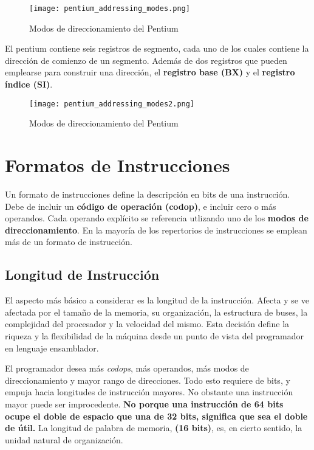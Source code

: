 \documentclass{article}
\begin{document}
\begin{figure}[h]
    \centering
    \texttt{[image: pentium\_addressing\_modes.png]}
    \caption{Modos de direccionamiento del Pentium
        \cite{stallings2006organización}}
    \label{fig:modos-direccionamiento-pentium}
\end{figure}

El pentium contiene seis registros de segmento, cada uno de los cuales contiene
la direcci\'{o}n de comienzo de un segmento. Adem\'{a}s de dos registros que
pueden emplearse para construir una direcci\'{o}n, el \textbf{registro base (BX)}
y el \textbf{registro \'{i}ndice (SI)}.

\begin{figure}[h]
    \centering
    \texttt{[image: pentium\_addressing\_modes2.png]}
    \caption{Modos de direccionamiento del Pentium
        \cite{stallings2006organización}}
    \label{fig:modos-direccionamiento-powerpc}
\end{figure}

\section*{Formatos de Instrucciones}
Un formato de instrucciones define la descripci\'{o}n en bits de una instrucci\'{o}n.
Debe de incluir un \textbf{c\'{o}digo de operaci\'{o}n (codop)}, e incluir
cero o m\'{a}s operandos. Cada operando expl\'{i}cito se referencia utlizando
uno de los \textbf{modos de direccionamiento}. En la mayor\'{i}a de los repertorios
de instrucciones se emplean m\'{a}s de un formato de instrucci\'{o}n.

\subsection*{Longitud de Instrucci\'{o}n}
El aspecto m\'{a}s b\'{a}sico a considerar es la longitud de la instrucci\'{o}n.
Afecta y se ve afectada por el tama\~{n}o de la memoria, su organizaci\'{o}n,
la estructura de buses, la complejidad del procesador y la velocidad del mismo.
Esta decisi\'{o}n define la riqueza y la flexibilidad de la m\'{a}quina desde un
punto de vista del programador en lenguaje ensamblador.

El programador desea m\'{a}s \textit{codops}, m\'{a}s operandos, m\'{a}s modos de
direccionamiento y mayor rango de direcciones. Todo esto requiere de bits, y
empuja hacia longitudes de instrucci\'{o}n mayores. No obstante una instrucci\'{o}n
mayor puede ser improcedente. \textbf{No porque una instrucci\'{o}n de 64 bits ocupe el
doble de espacio que una de 32 bits, significa que sea el doble de \'{u}til.}
La longitud de palabra de memoria, \textbf{(16 bits)}, es, en cierto sentido, la unidad natural de
organizaci\'{o}n.
\end{document}
